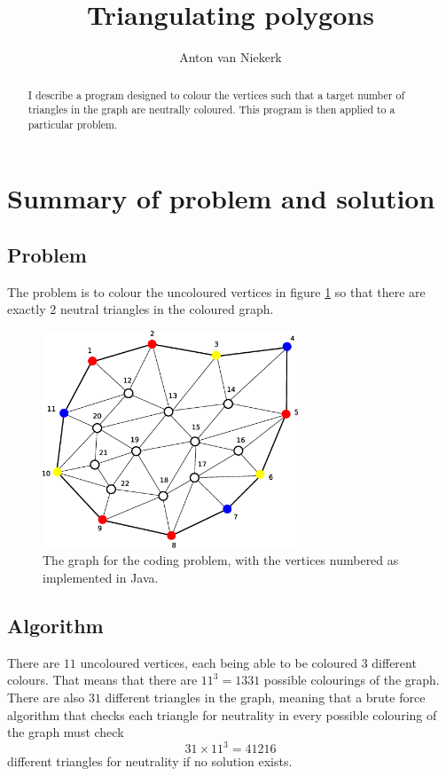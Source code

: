 \documentclass[letterpaper,10pt]{article}
\title{Triangulating polygons}
\author{Anton van Niekerk}
\begin{document}
\maketitle

\begin{abstract}
I describe a program designed to  colour the vertices such that a target number of triangles in the graph are neutrally coloured.
This program is then applied to a particular problem.
\end{abstract}

\section{Summary of problem and solution}
\subsection{Problem}
The problem is to colour the uncoloured vertices in figure \ref{problemfig} so that there are exactly $2$ neutral triangles in the coloured graph. 

\begin{figure}
\begin{center}
  \includegraphics[width=3in]{tripoly.eps}
\end{center}
  \caption{
The graph for the coding problem, with the vertices numbered as implemented in Java.} \label{problemfig}
\end{figure}
\subsection{Algorithm}
There are $11$ uncoloured vertices, each being able to be coloured $3$ different colours.  That means that there are $11^3 = 1331$ possible colourings 
of the graph.  There are also $31$ different triangles in the graph, meaning that a brute force algorithm that checks each triangle for neutrality 
in every possible colouring of the graph must check  
\begin{equation} \label{eq1}
 31\times11^3 = 41216
\end{equation}
 different triangles for neutrality if no solution exists.
\end{document}
